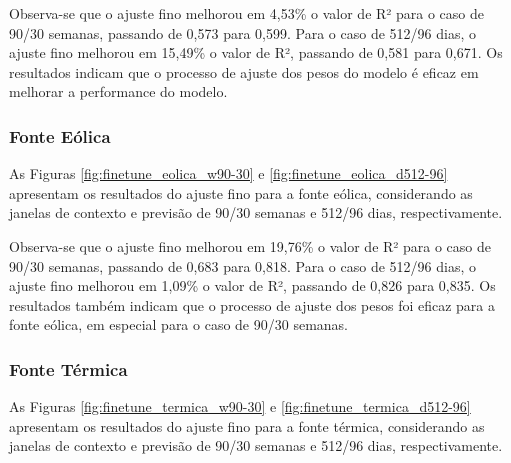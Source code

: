 Observa-se que o ajuste fino melhorou em 4,53\% o valor de R² para o caso de 90/30 semanas, passando de 0,573 para 0,599.
Para o caso de 512/96 dias, o ajuste fino melhorou em 15,49\% o valor de R², passando de 0,581 para 0,671. Os resultados 
indicam que o processo de ajuste dos pesos do modelo é eficaz em melhorar a performance do modelo.

\subsubsection{Fonte Eólica}
\begin{figure}[!ht]
  {}
  {}
\end{figure}
\begin{figure}[!ht]
  {}
  {}
\end{figure}
As Figuras \ref{fig:finetune_eolica_w90-30} e \ref{fig:finetune_eolica_d512-96} apresentam os resultados do ajuste fino
para a fonte eólica, considerando as janelas de contexto e previsão de 90/30 semanas e 512/96 dias, respectivamente.

Observa-se que o ajuste fino melhorou em 19,76\% o valor de R² para o caso de 90/30 semanas, passando de 0,683 para 0,818.
Para o caso de 512/96 dias, o ajuste fino melhorou em 1,09\% o valor de R², passando de 0,826 para 0,835. Os resultados
também indicam que o processo de ajuste dos pesos foi eficaz para a fonte eólica, em especial para o caso de 90/30 semanas.

\subsubsection{Fonte Térmica}
\begin{figure}[!ht]
  {}
  {}
\end{figure}
\begin{figure}[!ht]
  {}
  {}
\end{figure}
As Figuras \ref{fig:finetune_termica_w90-30} e \ref{fig:finetune_termica_d512-96} apresentam os resultados do ajuste fino
para a fonte térmica, considerando as janelas de contexto e previsão de 90/30 semanas e 512/96 dias, respectivamente.

